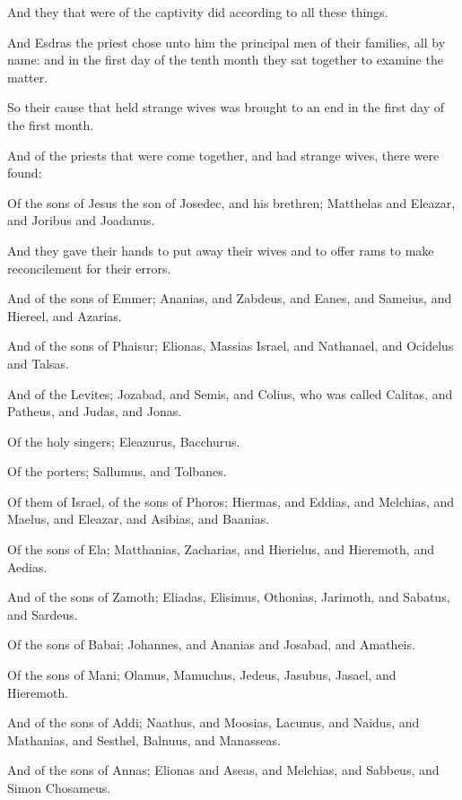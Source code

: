{\par }{\PP {}And they that were of the captivity did according to all these things.
\par }{\PP {}And Esdras the priest chose unto him the principal men of their families, all by name: and in the first day of the tenth month they sat together to examine the matter.
\par }{\PP {}So their cause that held strange wives was brought to an end in the first day of the first month.
\par }{\PP {}And of the priests that were come together, and had strange wives, there were found:
\par }{\PP {}Of the sons of Jesus the son of Josedec, and his brethren; Matthelas and Eleazar, and Joribus and Joadanus.
\par }{\PP {}And they gave their hands to put away their wives and to offer rams to make reconcilement for their errors.
\par }{\PP {}And of the sons of Emmer; Ananias, and Zabdeus, and Eanes, and Sameius, and Hiereel, and Azarias.
\par }{\PP {}And of the sons of Phaisur; Elionas, Massias Israel, and Nathanael, and Ocidelus and Talsas.
\par }{\PP {}And of the Levites; Jozabad, and Semis, and Colius, who was called Calitas, and Patheus, and Judas, and Jonas.
\par }{\PP {}Of the holy singers; Eleazurus, Bacchurus.
\par }{\PP {}Of the porters; Sallumus, and Tolbanes.
\par }{\PP {}Of them of Israel, of the sons of Phoros; Hiermas, and Eddias, and Melchias, and Maelus, and Eleazar, and Asibias, and Baanias.
\par }{\PP {}Of the sons of Ela; Matthanias, Zacharias, and Hierielus, and Hieremoth, and Aedias.
\par }{\PP {}And of the sons of Zamoth; Eliadas, Elisimus, Othonias, Jarimoth, and Sabatus, and Sardeus.
\par }{\PP {}Of the sons of Babai; Johannes, and Ananias and Josabad, and Amatheis.
\par }{\PP {}Of the sons of Mani; Olamus, Mamuchus, Jedeus, Jasubus, Jasael, and Hieremoth.
\par }{\PP {}And of the sons of Addi; Naathus, and Moosias, Lacunus, and Naidus, and Mathanias, and Sesthel, Balnuus, and Manasseas.
\par }{\PP {}And of the sons of Annas; Elionas and Aseas, and Melchias, and Sabbeus, and Simon Chosameus.
}
